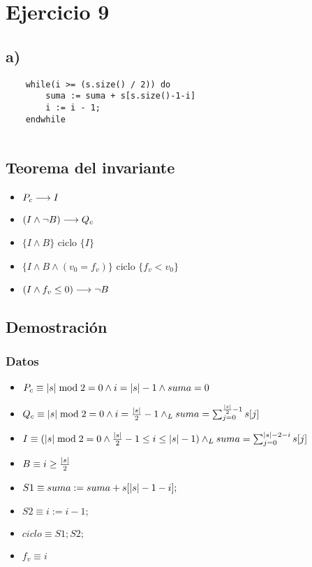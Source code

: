 \documentclass{article}
\begin{document}
\section*{Ejercicio 9}

\subsection*{a)}

\begin{verbatim}
    while(i >= (s.size() / 2)) do
        suma := suma + s[s.size()-1-i]
        i := i - 1;
    endwhile
    
\end{verbatim}
\subsection*{Teorema del invariante}
\begin{itemize}
    \item $P_{c} \longrightarrow I$
    \item $(I \wedge \neg B) \longrightarrow Q_{c}$
    \item $\{I \wedge B\}$ ciclo $\{ I \}$
    \item $\{I \wedge B \wedge (v_{0} = f_{v})\}$ ciclo $\{f_{v} < v_{0}\}$
    \item $(I \wedge f_{v} \leq 0) \longrightarrow \neg B$
\end{itemize}

\subsection*{Demostración}
\subsubsection*{Datos}
\begin{itemize}
    \item $P_{c}    \equiv |s| \bmod 2 = 0 \wedge i = |s| - 1 \wedge suma = 0 $
    \item $Q_{c}    \equiv |s| \bmod 2 = 0 \wedge i = \frac{|s|}{2} - 1 \land _L suma = \sum_{j=0}^{\frac{|s|}{2}-1} s[j] $
    \item $I        \equiv (|s| \bmod 2 = 0 \wedge \frac{|s|}{2} - 1 \leq i \leq |s| - 1) \land _L suma = \sum_{j=0}^{|s|-2-i} s[j] $
    \item $B        \equiv i \geq \frac{|s|}{2}$
    \item $S1       \equiv suma := suma + s[|s|-1-i];$
    \item $S2       \equiv i:= i - 1;$
    \item $ciclo    \equiv S1;S2;$
    \item $f_{v}    \equiv i$
\end{itemize}
\end{document}
